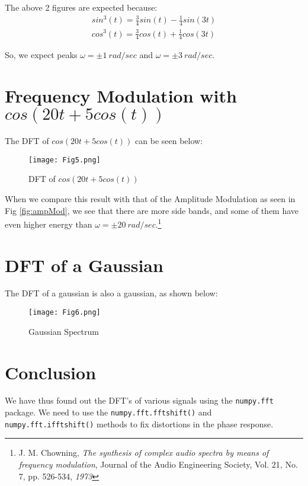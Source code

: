 \documentclass[11pt, a4paper, twoside]{article}
\begin{document}
The above 2 figures are expected because:
\begin{gather}
    sin^3(t) = \frac{3}{4}sin(t) - \frac{1}{4}sin(3t)\\
    cos^3(t) = \frac{3}{4}cos(t) + \frac{1}{4}cos(3t)
\end{gather}

So, we expect peaks $\omega = \pm 1\ rad/sec$ and $\omega = \pm 3\ rad/sec$.

\section{Frequency Modulation with $cos(20t + 5cos(t))$}
The DFT of $cos(20t + 5cos(t))$ can be seen below:
\begin{figure}[H]
    \centering
    \texttt{[image: Fig5.png]}
    \caption{DFT of $cos(20t + 5cos(t))$}
    \label{fig:freqMod}
\end{figure}

When we compare this result with that of the Amplitude Modulation as seen in Fig \eqref{fig:ampMod}, we see that there are more side bands, and some of them have even higher energy than $\omega = \pm 20 \ rad/sec$.\footnote{J. M. Chowning, \textit{The synthesis of complex audio spectra by means of frequency modulation}, Journal of the Audio Engineering Society, Vol. 21, No. 7, pp. 526-534, \textit{1973}}

\section{DFT of a Gaussian}
The DFT of a gaussian is also a gaussian, as shown below:
\begin{figure}[H]
    \centering
    \texttt{[image: Fig6.png]}
    \caption{Gaussian Spectrum}
    \label{fig:gauss}
\end{figure}

\section{Conclusion}
We have thus found out the DFT's of various signals using the \texttt{numpy.fft} package. We need to use the \texttt{numpy.fft.fftshift()} and \texttt{numpy.fft.ifftshift()} methods to fix distortions in the phase response.
\end{document}
